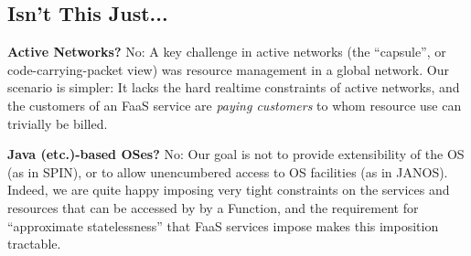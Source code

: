 \subsection{Isn't This Just...}

\textbf{Active Networks?}  No:  A key challenge in active networks (the
``capsule'', or code-carrying-packet view) was resource management in a
global network.  Our scenario is simpler:  It lacks the hard realtime
constraints of active networks, and the customers of an FaaS service are
\emph{paying customers} to whom resource use can trivially be billed.

\textbf{Java (etc.)-based OSes?}  No:  Our goal is not to provide
extensibility of the OS (as in SPIN), or to allow unencumbered
access to OS facilities (as in JANOS).  Indeed, we are quite happy
imposing very tight constraints on the services and resources that
can be accessed by by a Function, and the requirement for ``approximate
statelessness'' that FaaS services impose makes this imposition tractable.
